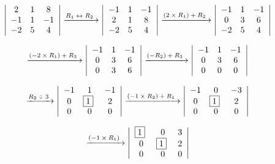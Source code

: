 \documentclass{article}
\begin{document}
\[
\left| \begin{array}{ccc}
2 & 1 & 8 \\
-1 & 1 & -1  \\
-2 & 5 & 4
\end{array} \right|
\xrightarrow[]{\text{$R\textsubscript{1} \leftrightarrow R\textsubscript{2}$~}}
\left| \begin{array}{ccc}
-1 & 1 & -1  \\
2 & 1 & 8 \\
-2 & 5 & 4
\end{array} \right|
\xrightarrow[]{\text{$ (2 \times R\textsubscript{1}) + R\textsubscript{2} $~}}
\left| \begin{array}{ccc}
-1 & 1 & -1  \\
0 & 3 & 6 \\
-2 & 5 & 4
\end{array} \right|
\]

\[
\xrightarrow[]{\text{$ (-2 \times R\textsubscript{1}) + R\textsubscript{3} $~}}
\left| \begin{array}{ccc}
-1 & 1 & -1  \\
0 & 3 & 6 \\
0 & 3 & 6
\end{array} \right|
\xrightarrow[]{\text{$ (-R\textsubscript{2}) + R\textsubscript{3} $~}}
\left| \begin{array}{ccc}
-1 & 1 & -1  \\
0 & 3 & 6 \\
0 & 0 & 0
\end{array} \right|
\]

\[
\xrightarrow[]{\text{$ R\textsubscript{2} \div 3 $~}}
\left| \begin{array}{ccc}
-1 & 1 & -1  \\
0 & $\boxed{1}$~ & 2 \\
0 & 0 & 0
\end{array} \right|
\xrightarrow[]{\text{$ (-1 \times R\textsubscript{2}) + R\textsubscript{1} $~}}
\left| \begin{array}{ccc}
-1 & 0 & -3  \\
0 & $\boxed{1}$~ & 2 \\
0 & 0 & 0
\end{array} \right|
\]

\[
\xrightarrow[]{\text{$ (-1 \times R\textsubscript{1}) $~}}
\left| \begin{array}{ccc}
$\boxed{1}$~ & 0 & 3  \\
0 & $\boxed{1}$~ & 2 \\
0 & 0 & 0
\end{array} \right|
\]
\end{document}

